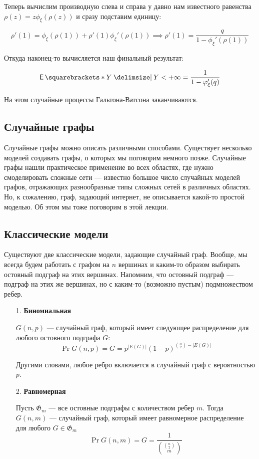 Теперь вычислим производную слева и справа у давно нам известного равенства
$\rho(z) = z\phi_{\xi}(\rho(z))$ и сразу подставим единицу:

\[
  \rho'(1) = \phi_{\xi}(\rho(1)) + \rho'(1)\phi_{\xi}'(\rho(1))
  \implies
  \rho'(1) = \frac{q}{1 - \phi_{\xi}'(\rho(1))}
\]

Откуда наконец-то вычисляется наш финальный результат:

  
\[
  \E{Y \given Y < +\infty} = \frac{1}{1 - \phi_{\xi}'(q)}
\]

На этом случайные процессы Гальтона-Ватсона заканчиваются.

\subsection{Случайные графы}

Случайные графы можно описать различными способами. Существует несколько
моделей создавать графы, о которых мы поговорим немного позже. Случайные графы 
нашли практическое применение во всех областях, где нужно смоделировать 
сложные сети --- известно большое число случайных моделей графов, отражающих 
разнообразные типы сложных сетей в различных областях. Но, к сожалению, граф,
задающий интернет, не описывается какой-то простой моделью. Об этом мы тоже
поговорим в этой лекции.

\subsection{Классические модели}

Существуют две классические модели, задающие случайный граф. Вообще, мы всегда
будем работать с графом на $n$ вершинах и каким-то образом выбирать остовный
подграф на этих вершинах. Напомним, что остовный подграф --- подграф на этих
же вершинах, но с каким-то (возможно пустым) подмножеством ребер.

\begin{itemize}
  \item[1.] \textbf{Биномиальная}
  \begin{definition}
    $G(n, p)$ --- случайный граф, который имеет следующее распределение для любого остовного
    подграфа $G$:
    \[
      \Pr{G(n, p) = G} = p^{|E(G)|}(1 - p)^{\binom{n}{2} - |E(G)|}
    \]
  \end{definition}

  Другими словами, любое ребро включается в случайный граф с вероятностью $p$.

  \item[2.] \textbf{Равномерная}
  \begin{definition}
    Пусть $\mathfrak{G}_m$ --- все остовные подграфы с количеством ребер $m$.
    Тогда $G(n, m)$ --- случайный граф, который имеет равномерное распределение для любого
    $G \in \mathfrak{G}_m$
    \[
      \Pr{G(n, m) = G} = \frac{1}{\binom{\binom{n}{2}}{m}}
    \]
  \end{definition}
\end{itemize}

